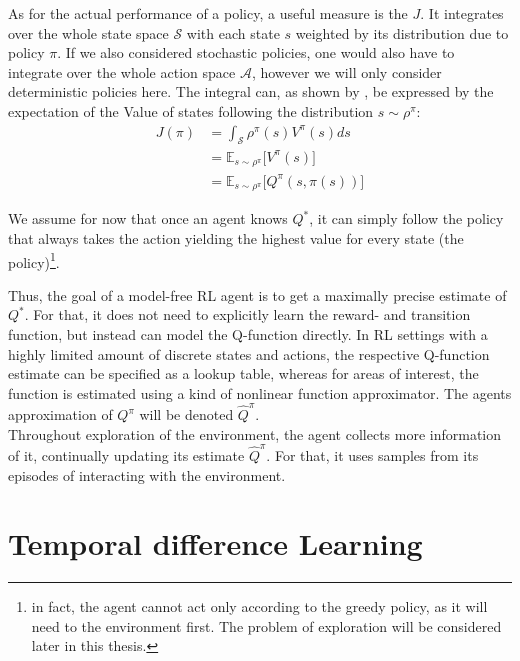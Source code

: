 As for the actual performance of a policy, a useful measure is the  $J$. It integrates over the whole state space $\mathcal{S}$ with each state $s$ weighted by its distribution due to policy $\pi$. If we also considered stochastic policies, one would also have to integrate over the whole action space $\mathcal{A}$, however we will only consider deterministic policies here. The integral can, as shown by \cite{silver_deterministic_2014}, be expressed by the expectation of the Value of states following the distribution $s\sim\rho^\pi$:
\begin{align}
	J(\pi) &= \int_\mathcal{S} \rho^\pi(s) V^\pi(s) ds\\
	       &= \mathds{E}_{s\sim\rho^\pi} \big[V^\pi(s)]\\
	       &= \mathds{E}_{s\sim\rho^\pi} \big[Q^\pi(s, \pi(s))]
\end{align}


\noindent We assume for now that once an agent knows $Q^*$, it can simply follow the policy that always takes the action yielding the highest value for every state (the  policy)\footnote{in fact, the agent cannot act only according to the greedy policy, as it will need to  the environment first. The problem of exploration will be considered later in this thesis.}. 

Thus, the goal of a model-free RL agent is to get a maximally precise estimate of $Q^*$. For that, it does not need to explicitly learn the reward- and transition function, but instead can model the Q-function directly. In RL settings with a highly limited amount of discrete states and actions, the respective Q-function estimate can be specified as a lookup table, whereas for areas of interest, the function is estimated using a kind of nonlinear function approximator. The agents approximation of $Q^\pi$ will be denoted $\hat{Q}^\pi$. \\

\noindent Throughout exploration of the environment, the agent collects more information of it, continually updating its estimate $\hat{Q}^\pi$. For that, it uses samples from its episodes of interacting with the environment. %


\section{Temporal difference Learning}

